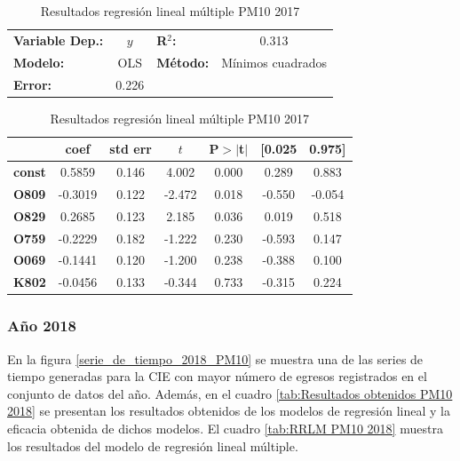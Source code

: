 \begin{table}[hbt!]
\caption{Resultados regresión lineal múltiple PM10 2017}
\label{tab:RRLM PM10 2017}
\begin{center}
\begin{tabular}{lclc}
\toprule
\textbf{Variable Dep.:}    &        $y$         & \textbf{  R$^2$:         } &     0.313   \\
\textbf{Modelo:}            &       OLS        & \textbf{Método:}           &  Mínimos cuadrados  \\
\textbf{Error:}            & 0.226  \\
\bottomrule
\end{tabular}
\begin{tabular}{lcccccc}
               & \textbf{coef} & \textbf{std err} & \textbf{$t$} & \textbf{P$> |$t$|$} & \textbf{[0.025} & \textbf{0.975]}  \\
\midrule
\textbf{const} &       0.5859  &        0.146     &     4.002  &         0.000        &        0.289    &        0.883     \\
\textbf{O809}  &      -0.3019  &        0.122     &    -2.472  &         0.018        &       -0.550    &       -0.054     \\
\textbf{O829}  &       0.2685  &        0.123     &     2.185  &         0.036        &        0.019    &        0.518     \\
\textbf{O759}  &      -0.2229  &        0.182     &    -1.222  &         0.230        &       -0.593    &        0.147     \\
\textbf{O069}  &      -0.1441  &        0.120     &    -1.200  &         0.238        &       -0.388    &        0.100     \\
\textbf{K802}  &      -0.0456  &        0.133     &    -0.344  &         0.733        &       -0.315    &        0.224     \\
\bottomrule
\end{tabular}
\end{center}
\end{table}

\clearpage
\subsubsection{Año 2018}
En la figura \ref{serie_de_tiempo_2018_PM10} se muestra una de las series de tiempo generadas para la CIE con mayor número de egresos registrados en el conjunto de datos del año. Además, en el cuadro \ref{tab:Resultados obtenidos PM10 2018} se presentan los resultados obtenidos de los modelos de regresión lineal y la eficacia obtenida de dichos modelos. El cuadro \ref{tab:RRLM PM10 2018} muestra los resultados del modelo de regresión lineal múltiple.

